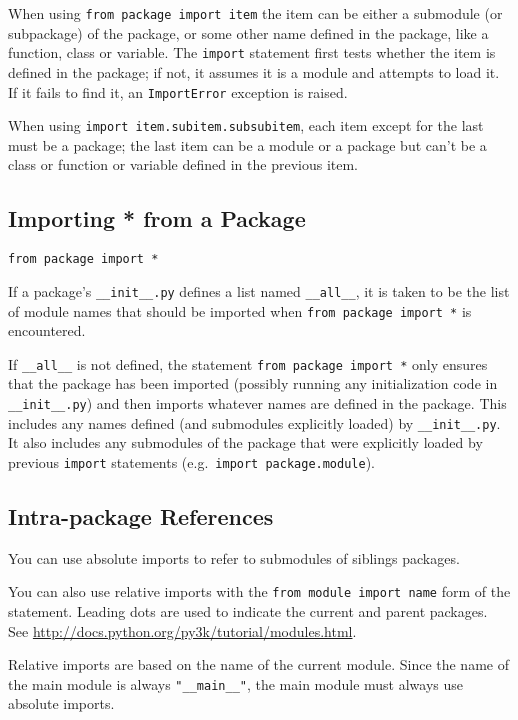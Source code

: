 When using \verb=from package import item=
the item can be either a submodule (or subpackage) of the package,
or some other name defined in the package,
like a function, class or variable.
The \verb=import= statement
first tests whether the item is defined in the package;
if not, it assumes it is a module and attempts to load it.
If it fails to find it, an \verb=ImportError= exception is raised.

When using \verb=import item.subitem.subsubitem=,
each item except for the last must be a package;
the last item can be a module or a package
but can't be a class or function or variable defined in the previous item.

\subsection{Importing * from a Package}

\verb=from package import *=

If a package's \verb=__init__.py= defines a list named \verb=__all__=,
it is taken to be the list of module names that should be imported
when \verb=from package import *= is encountered.

If \verb=__all__= is not defined, the statement \verb=from package import *=
only ensures that the package has been imported
(possibly running any initialization code in \verb=__init__.py=)
and then imports whatever names are defined in the package.
This includes any names defined (and submodules explicitly loaded)
by \verb=__init__.py=.
It also includes any submodules of the package that were explicitly loaded
by previous \verb=import= statements
(e.g.\ \verb=import package.module=).

\subsection{Intra-package References}

You can use absolute imports to refer to submodules of siblings packages.

You can also use relative imports
with the \verb=from module import name= form of the statement.
Leading dots are used to indicate the current and parent packages.
See \url{http://docs.python.org/py3k/tutorial/modules.html}.

Relative imports are based on the name of the current module.
Since the name of the main module is always \verb="__main__"=,
the main module must always use absolute imports.
